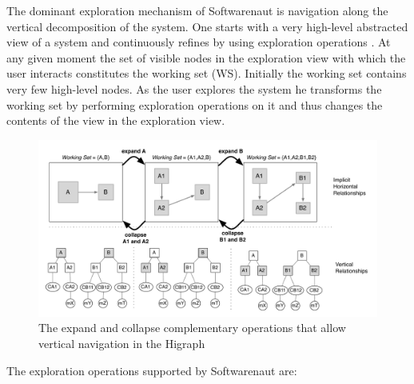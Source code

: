 \documentclass[preprint,12pt]{elsarticle}
\begin{document}
The dominant exploration mechanism of Softwarenaut is navigation along the vertical decomposition of the system. One starts with a very high-level abstracted view of a system and continuously refines by using exploration operations \cite{robertson-conetrees}. At any given moment the set of visible nodes in the exploration view with which the user interacts constitutes the working set (WS). Initially the working set contains very few high-level nodes. As the user explores the system he transforms the working set by performing exploration operations on it and thus changes the contents of the view in the exploration view.

\begin{figure}[ht]
\begin{center}
\includegraphics[width=\linewidth]{SnautSequence}
\caption{The expand and collapse complementary operations that allow vertical navigation in the Higraph}
\label{}
\end{center}
\end{figure}

The exploration operations supported by Softwarenaut are:
\end{document}
